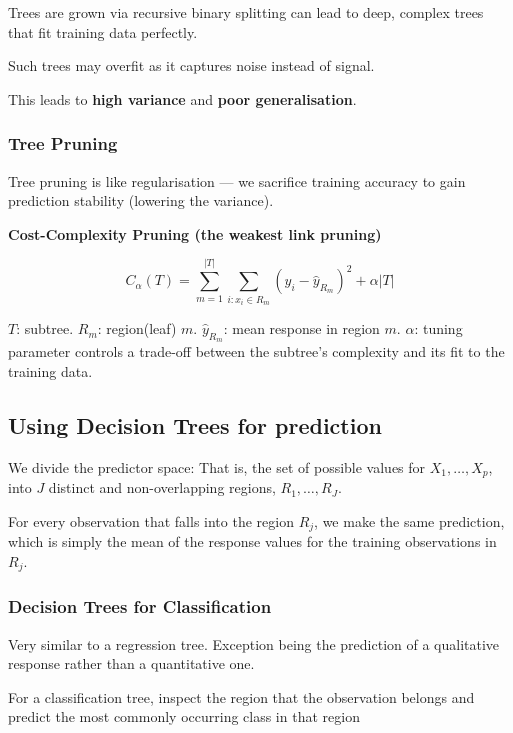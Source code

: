 \indent 

Trees are grown via recursive binary splitting can lead to deep, complex trees that fit training data perfectly.

Such trees may overfit as it captures noise instead of signal.

This leads to \textbf{high variance} and \textbf{poor generalisation}.

\subsubsection{Tree Pruning}

\indent

Tree pruning is like regularisation — we sacrifice training accuracy to gain prediction stability (lowering the variance).

\noindent\textbf{Cost-Complexity Pruning (the weakest link pruning)}

\[
C_{\alpha}(T) = \sum_{m=1}^{|T|}\sum_{i:x_i\in R_m}(y_i - \hat{y}_{R_m})^2 + \alpha |T|
\]

$T$: subtree. $R_m$: region(leaf) $m$. $\hat{y}_{R_m}$: mean response in region $m$. $\alpha$: tuning parameter controls a trade-off between the subtree’s complexity and its fit to the training data.

\subsection{Using Decision Trees for prediction}

\indent 

We divide the predictor space: That is, the set of possible values for $X_1,\ldots,X_p$, into $J$ distinct and non-overlapping regions, $R_1,\ldots, R_J$.

For every observation that falls into the region $R_j$, we make the same prediction, which is simply the mean of the response values for the training observations in $R_j$.

\subsubsection{Decision Trees for Classification}

\indent 

Very similar to a regression tree. Exception being the prediction of a qualitative response rather than a quantitative one.

For a classification tree, inspect the region that the observation belongs and predict the most commonly occurring class in that region

